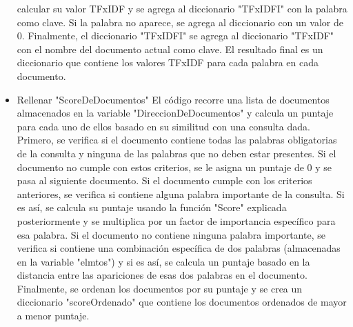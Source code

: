 \documentclass{article}
\begin{document}
\begin{itemize}
    calcular su valor TFxIDF y se agrega al diccionario "TFxIDFI" con la palabra 
    como clave. Si la palabra no aparece, se agrega al diccionario con un valor de 
    0. 
    Finalmente, el diccionario "TFxIDFI" se agrega al diccionario "TFxIDF" con el 
    nombre del documento actual como clave. El resultado final es un diccionario 
    que contiene los valores TFxIDF para cada palabra en cada documento.
    \item Rellenar "ScoreDeDocumentos" 
    El código recorre una lista de documentos almacenados en la variable 
    "DireccionDeDocumentos" y calcula un puntaje para cada uno de ellos basado 
    en su similitud con una consulta dada. 
    Primero, se verifica si el documento contiene todas las palabras obligatorias de 
    la consulta y ninguna de las palabras que no deben estar presentes. Si el 
    documento no cumple con estos criterios, se le asigna un puntaje de 0 y se 
    pasa al siguiente documento. 
    Si el documento cumple con los criterios anteriores, se verifica si contiene 
    alguna palabra importante de la consulta. Si es así, se calcula su puntaje 
    usando la función "Score" explicada posteriormente y se multiplica por un factor 
    de importancia específico para esa palabra. Si el documento no contiene 
    ninguna palabra importante, se verifica si contiene una combinación específica 
    de dos palabras (almacenadas en la variable "elmtos") y si es así, se calcula un 
    puntaje basado en la distancia entre las apariciones de esas dos palabras en el 
    documento. 
    Finalmente, se ordenan los documentos por su puntaje y se crea un diccionario 
    "scoreOrdenado" que contiene los documentos ordenados de mayor a menor 
    puntaje.
\end{itemize} 
\end{document}
